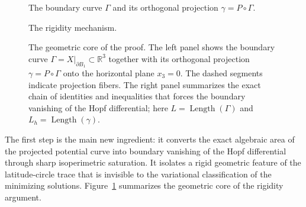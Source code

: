 \documentclass[11pt]{amsart}
\numberwithin{equation}{section}
\theoremstyle{remark}
\newcommand{\R}{\mathbb{R}}
\DeclareMathOperator{\Area}{Area}
\DeclareMathOperator{\Length}{Length}
\begin{document}
\begin{figure}[t]
\begin{minipage}{0.46\textwidth}
\smallskip
{\scriptsize The boundary curve $\Gamma$ and its orthogonal projection $\gamma=P\circ\Gamma$.}
\end{minipage}\hfill
\begin{minipage}{0.52\textwidth}
\centering
{}

\smallskip
{\scriptsize The rigidity mechanism.}
\end{minipage}
\caption{The geometric core of the proof. The left panel shows the boundary curve $\Gamma=X|_{\partial B_1}\subset\R^3$ together with its
orthogonal projection $\gamma=P\circ\Gamma$ onto the horizontal plane $x_3=0$. The dashed segments indicate projection fibers. The right panel
summarizes the exact chain of identities and inequalities that forces the boundary vanishing of the Hopf differential; here
$L=\Length(\Gamma)$ and $L_h=\Length(\gamma)$.}
\label{fig:proof}
\end{figure}

The first step is the main new ingredient: it converts the exact algebraic area of the projected potential curve into boundary vanishing of
the Hopf differential through sharp isoperimetric saturation. It isolates a rigid geometric feature of the latitude-circle trace that is
invisible to the variational classification of the minimizing solutions. Figure~\ref{fig:proof} summarizes the geometric core of the rigidity
argument.
\end{document}
